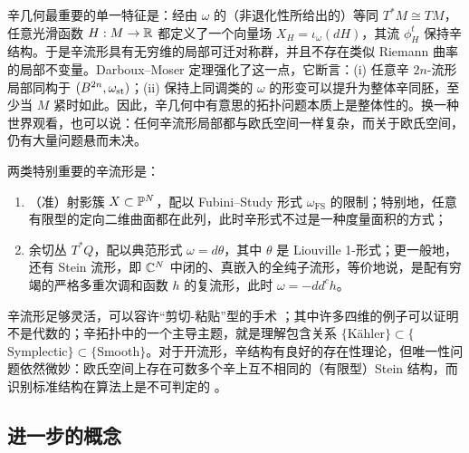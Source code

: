 辛几何最重要的单一特征是：经由 $\omega$ 的（非退化性所给出的）等同 $T^*M \cong TM$，任意光滑函数 $H: M \rightarrow \mathbb{R}$ 都定义了一个向量场 $X_H = \iota_{\omega}(dH)$，其流 $\phi^t_H$ 保持辛结构。于是辛流形具有无穷维的局部可迁对称群，并且不存在类似 Riemann 曲率的局部不变量。Darboux--Moser 定理强化了这一点，它断言：(i) 任意辛 $2n$-流形局部同构于 $(B^{2n}, \omega_{\operatorname{st}})$；(ii) 保持上同调类的 $\omega$ 的形变可以提升为整体辛同胚，至少当 $M$ 紧时如此。因此，辛几何中有意思的拓扑问题本质上是整体性的。换一种世界观看，也可以说：任何辛流形局部都与欧氏空间一样复杂，而关于欧氏空间，仍有大量问题悬而未决。


两类特别重要的辛流形是：
\begin{enumerate}
\item （准）射影簇 $X \subset \mathbb{P}^N$，配以 Fubini--Study 形式 $\omega_{\operatorname{FS}}$ 的限制；特别地，任意有限型的定向二维曲面都在此列，此时辛形式不过是一种度量面积的方式；
\item 余切丛 $T^*Q$，配以典范形式 $\omega =d\theta$，其中 $\theta$ 是 Liouville 1-形式；更一般地，还有 Stein 流形，即 $\mathbb{C}^N$ 中闭的、真嵌入的全纯子流形，等价地说，是配有穷竭的严格多重次调和函数 $h$ 的复流形，此时 $\omega = -dd^ch$。
\end{enumerate}


辛流形足够灵活，可以容许“剪切-粘贴”型的手术 \cite{Gompf}；其中许多四维的例子可以证明不是代数的；辛拓扑中的一个主导主题，就是理解包含关系 $\{$K\"ahler$\} \subset \{$Symplectic$\} \subset \{$Smooth$\}$。对于开流形，辛结构有良好的存在性理论，但唯一性问题依然微妙：欧氏空间上存在可数多个辛上互不相同的（有限型）Stein 结构，而识别标准结构在算法上是不可判定的 \cite{McLean:Computability}。

\subsection{进一步的概念}

